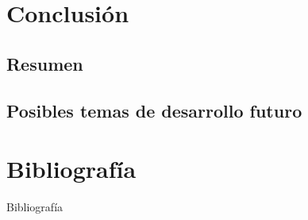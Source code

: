 \documentclass{beamer}
\begin{document}
\section{Conclusión}

\subsection{Resumen}

\subsection{Posibles temas de desarrollo futuro}



\section{Bibliografía}

\begin{frame}{Bibliografía}
	
\end{frame}
\end{document}
